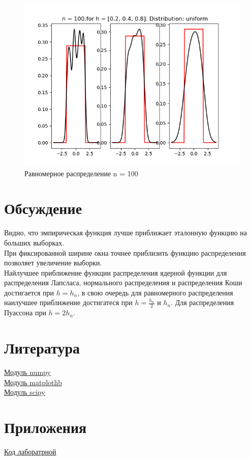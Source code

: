 \documentclass[a4]{article}
\begin{document}
\begin{center}
\begin{figure}[h!]
			\includegraphics[width=\textwidth]{uniformker100.png}
			\caption[Равномерное распределение n = 100]{Равномерное распределение n = 100}
		\end{figure}
		
	\end{center}
		
	\newpage
	\section{Обсуждение}
		Видно, что эмпирическая функция лучше приближает эталонную функцию на больших выборках.\\
		
		При фиксированной ширине окна точнее приблизить функцию распределения позволяет увеличение выборки.\\
		
		Найлучшее приближение функции распределения ядерной функции для распределения Лапсласа, нормального распределения и распределения Коши достигается при $h =  h_n$, в свою очередь для равномерного распределения наилучшее приближение достигатеся при $ h = \frac{h_n}{2}$ и $h_n$. Для распределения Пуассона при $h = 2h_n$.
	
	\section{Литература}
	
	\href{https://physics.susu.ru/vorontsov/language/numpy.html}{Модуль numpy}\\
	
	\href{https://matplotlib.org/}{Модуль matplotlib}\\
	
	\href{https://www.scipy.org/}{Модуль scipy}\\
	
	
	\section{Приложения}
	
	\href{https://github.com/dmitry-maltsov/PolyMatStat/blob/master/4/lab4.py}{Код лаборатрной}
	
	
\end{document}
